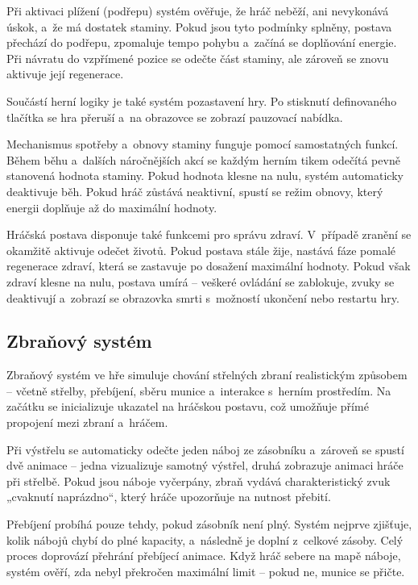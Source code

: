Při aktivaci plížení (podřepu) systém ověřuje, že hráč neběží, ani nevykonává úskok, a~že má dostatek staminy. Pokud jsou tyto podmínky splněny, postava přechází do podřepu, zpomaluje tempo pohybu a~začíná se doplňování energie. Při návratu do vzpřímené pozice se odečte část staminy, ale zároveň se znovu aktivuje její regenerace.

Součástí herní logiky je také systém pozastavení hry. Po stisknutí definovaného tlačítka se hra přeruší a~na obrazovce se zobrazí pauzovací nabídka.

Mechanismus spotřeby a~obnovy staminy funguje pomocí samostatných funkcí. Během běhu a~dalších náročnějších akcí se každým herním tikem odečítá pevně stanovená hodnota staminy. Pokud hodnota klesne na nulu, systém automaticky deaktivuje běh. Pokud hráč zůstává neaktivní, spustí se režim obnovy, který energii doplňuje až do maximální hodnoty.

Hráčská postava disponuje také funkcemi pro správu zdraví. V~případě zranění se okamžitě aktivuje odečet životů. Pokud postava stále žije, nastává fáze pomalé regenerace zdraví, která se zastavuje po dosažení maximální hodnoty. Pokud však zdraví klesne na nulu, postava umírá – veškeré ovládání se zablokuje, zvuky se deaktivují a~zobrazí se obrazovka smrti s~možností ukončení nebo restartu hry.

\newpage

\subsection{Zbraňový systém}
Zbraňový systém ve hře simuluje chování střelných zbraní realistickým způsobem – včetně střelby, přebíjení, sběru munice a~interakce s~herním prostředím. Na začátku se inicializuje ukazatel na hráčskou postavu, což umožňuje přímé propojení mezi zbraní a~hráčem.

Při výstřelu se automaticky odečte jeden náboj ze zásobníku a~zároveň se spustí dvě animace – jedna vizualizuje samotný výstřel, druhá zobrazuje animaci hráče při střelbě. Pokud jsou náboje vyčerpány, zbraň vydává charakteristický zvuk „cvaknutí naprázdno“, který hráče upozorňuje na nutnost přebití.

Přebíjení probíhá pouze tehdy, pokud zásobník není plný. Systém nejprve zjišťuje, kolik nábojů chybí do plné kapacity, a~následně je doplní z~celkové zásoby. Celý proces doprovází přehrání přebíjecí animace. Když hráč sebere na mapě náboje, systém ověří, zda nebyl překročen maximální limit – pokud ne, munice se přičte.

